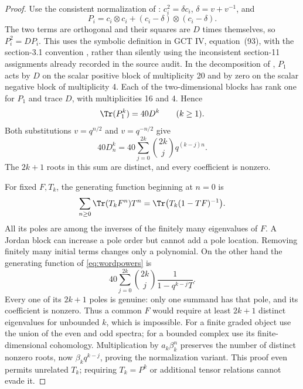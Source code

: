 \begin{proof}
Use the consistent normalization of : $c_i^2=\delta c_i$,
$\delta=v+v^{-1}$, and
\[
 P_i=c_i\otimes c_i+(c_i-\delta)\otimes(c_i-\delta).
\]
The two terms are orthogonal and their squares are $D$ times
themselves, so $P_i^2=DP_i$. This uses the symbolic definition
in GCT IV, equation~(93), with the section-3.1 convention
\cite[\S3.1 and Definition~11.1, equation~(93)]{IV},
rather than silently using the inconsistent section-11
assignments already recorded in the source audit.
In the decomposition of , $P_1$ acts by $D$ on
the scalar positive block of multiplicity 20 and by zero on
the scalar negative block of multiplicity 4. Each of the
two-dimensional blocks has rank one for $P_1$ and trace $D$,
with multiplicities 16 and 4. Hence
\[
 \Tr(P_1^k)=40D^k\qquad(k\ge1).
\]
Both substitutions $v=q^{n/2}$ and $v=q^{-n/2}$ give
\begin{equation}\label{eq:wordpowers}
 40D_n^k
   =40\sum_{j=0}^{2k}\binom{2k}{j}q^{(k-j)n}.
\end{equation}
The $2k+1$ roots in this sum are distinct, and every coefficient
is nonzero.

For fixed $F,T_k$, the generating function beginning at $n=0$ is
\[
 \sum_{n\ge0}\Tr(T_kF^n)T^n
   =\Tr\bigl(T_k(1-TF)^{-1}\bigr).
\]
All its poles are among the inverses of the finitely many
eigenvalues of $F$. A Jordan block can increase a pole order
but cannot add a pole location. Removing finitely many initial
terms changes only a polynomial. On the other hand the
generating function of \eqref{eq:wordpowers} is
\[
 40\sum_{j=0}^{2k}\binom{2k}{j}
      \frac{1}{1-q^{k-j}T}.
\]
Every one of its $2k+1$ poles is genuine: only one summand has
that pole, and its coefficient is nonzero. Thus a common $F$
would require at least $2k+1$ distinct eigenvalues for unbounded
$k$, which is impossible.
For a finite graded object use the union of the even and odd
spectra; for a bounded complex use its finite-dimensional
cohomology. Multiplication by $a_k\beta_k^n$ preserves the
number of distinct nonzero roots, now
$\beta_kq^{k-j}$, proving the normalization variant.
This proof even permits unrelated $T_k$; requiring
$T_k=P^k$ or additional tensor relations cannot evade it.


\end{proof}
